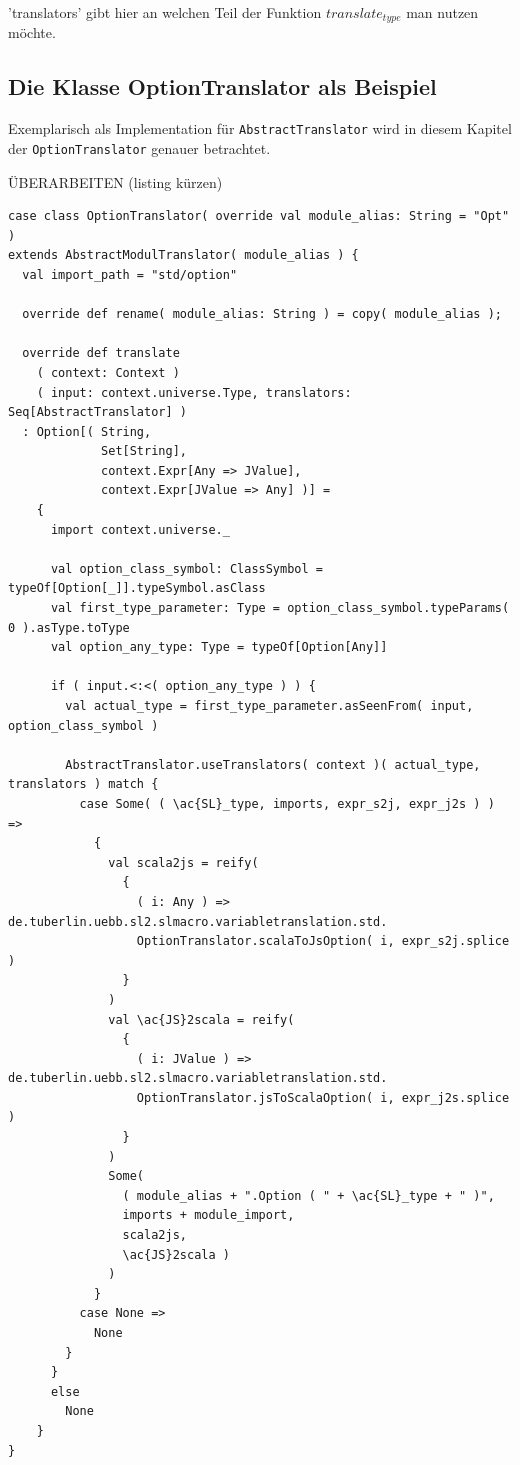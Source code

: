 \documentclass[12pt]{scrreprt}
\begin{document}
'translators' gibt hier an welchen Teil der Funktion $translate_{type}$ man nutzen möchte.

\subsection{Die Klasse OptionTranslator als Beispiel}

Exemplarisch als Implementation für \lstinline!AbstractTranslator! wird in diesem Kapitel der \lstinline!OptionTranslator! genauer betrachtet.

ÜBERARBEITEN (listing kürzen)

\begin{lstlisting}[caption=Source Code von OptionTranslator, label=lst:source option translator]
case class OptionTranslator( override val module_alias: String = "Opt" ) 
extends AbstractModulTranslator( module_alias ) {
  val import_path = "std/option"

  override def rename( module_alias: String ) = copy( module_alias );
  
  override def translate
    ( context: Context )
    ( input: context.universe.Type, translators: Seq[AbstractTranslator] )
  : Option[( String, 
             Set[String], 
             context.Expr[Any => JValue], 
             context.Expr[JValue => Any] )] =
    {
      import context.universe._

      val option_class_symbol: ClassSymbol = typeOf[Option[_]].typeSymbol.asClass
      val first_type_parameter: Type = option_class_symbol.typeParams( 0 ).asType.toType
      val option_any_type: Type = typeOf[Option[Any]]

      if ( input.<:<( option_any_type ) ) {
        val actual_type = first_type_parameter.asSeenFrom( input, option_class_symbol )

        AbstractTranslator.useTranslators( context )( actual_type, translators ) match {
          case Some( ( \ac{SL}_type, imports, expr_s2j, expr_j2s ) ) =>
            {
              val scala2js = reify( 
                { 
                  ( i: Any ) => de.tuberlin.uebb.sl2.slmacro.variabletranslation.std.
                  OptionTranslator.scalaToJsOption( i, expr_s2j.splice ) 
                } 
              )
              val \ac{JS}2scala = reify( 
                { 
                  ( i: JValue ) => de.tuberlin.uebb.sl2.slmacro.variabletranslation.std.
                  OptionTranslator.jsToScalaOption( i, expr_j2s.splice ) 
                } 
              )
              Some( 
                ( module_alias + ".Option ( " + \ac{SL}_type + " )", 
                imports + module_import, 
                scala2js, 
                \ac{JS}2scala ) 
              )
            }
          case None =>
            None
        }
      }
      else
        None
    }
}


\end{lstlisting}
\end{document}
